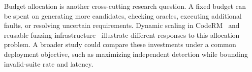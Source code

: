 Budget allocation is another cross-cutting research question. A fixed budget can be spent on generating more candidates, checking oracles, executing additional faults, or resolving uncertain requirements. Dynamic scaling in CodeRM~\cite{T06} and reusable fuzzing infrastructure~\cite{F05,F06,F07} illustrate different responses to this allocation problem. A broader study could compare these investments under a common deployment objective, such as maximizing independent detection while bounding invalid-suite rate and latency.
